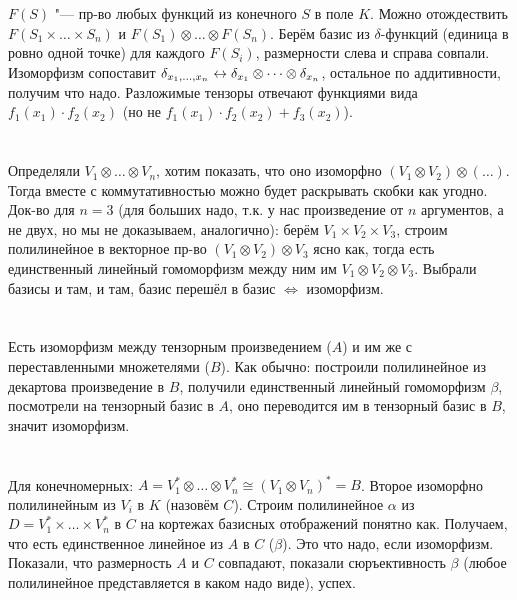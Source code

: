 \section{} %
$F(S)$ "--- пр-во любых функций из конечного $S$ в поле $K$.
Можно отождествить $F(S_1 \times \dots \times S_n)$ и $F(S_1) \otimes \dots \otimes F(S_n)$.
Берём базис из $\delta$-функций (единица в ровно одной точке) для каждого $F(S_i)$, размерности слева и справа совпали.
Изоморфизм сопоставит $\delta_{x_1, \dots, x_n} \leftrightarrow \delta_{x_1} \otimes \dots \otimes \delta_{x_n}$,
остальное по аддитивности, получим что надо.
Разложимые тензоры отвечают функциями вида $f_1(x_1) \cdot f_2(x_2)$ (но не $f_1(x_1)\cdot f_2(x_2) + f_3(x_2)$).

\section{} %
\TODO

\section{} %
Определяли $V_1 \otimes \dots \otimes V_n$,
хотим показать, что оно изоморфно $(V_1 \otimes V_2) \otimes (\dots)$.
Тогда вместе с коммутативностью можно будет раскрывать скобки как угодно.
Док-во для $n=3$ (для больших надо, т.к. у нас произведение от $n$ аргументов, а не двух,
но мы не доказываем, аналогично): берём $V_1 \times V_2 \times V_3$, строим полилинейное в
векторное пр-во $(V_1 \otimes V_2) \otimes V_3$ ясно как, тогда есть единственный линейный гомоморфизм
между ним им $V_1 \otimes V_2 \otimes V_3$.
Выбрали базисы и там, и там, базис перешёл в базис $\iff$ изоморфизм.

\section{} %
Есть изоморфизм между тензорным произведением ($A$) и им же с переставленными множетелями ($B$).
Как обычно: построили полилинейное из декартова произведение в $B$, получили единственный линейный
гомоморфизм $\beta$, посмотрели на тензорный базис в $A$, оно переводится им в тензорный базис в $B$,
значит изоморфизм.

\section{} %
Для конечномерных: $A=V_1^* \otimes \dots \otimes V_n^* \cong (V_1 \otimes V_n)^*=B$.
Второе изоморфно полилинейным из $V_i$ в $K$ (назовём $C$).
Строим полилинейное $\alpha$ из $D=V_1^* \times \dots \times V_n^*$ в $C$ на кортежах базисных отображений понятно как.
Получаем, что есть единственное линейное из $A$ в $C$ ($\beta$).
Это что надо, если изоморфизм.
Показали, что размерность $A$ и $C$ совпадают, показали сюръективность $\beta$ (любое полилинейное
представляется в каком надо виде), успех.

\section{} %
